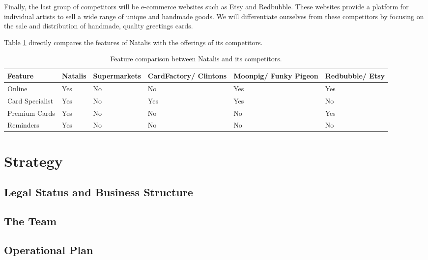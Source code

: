 \documentclass[10pt, a4paper]{article}
\begin{document}
Finally, the last group of competitors will be e-commerce websites such as Etsy and Redbubble. These websites provide a platform for individual artists to sell a wide range of unique and handmade goods. We will differentiate ourselves from these competitors by focusing on the sale and distribution of handmade, quality greetings cards.

Table \ref{table:competitor_analysis} directly compares the features of Natalis with the offerings of its competitors.

\begin{table}[h]\footnotesize\centering
 \begin{tabular}{ | p{2cm} | p{2cm} | p{2cm} | p{2cm} | p{2cm} | p{2cm} | }
    \hline
    Feature & Natalis & Supermarkets & CardFactory/ Clintons & Moonpig/ Funky Pigeon & Redbubble/ Etsy \\
    \hline
    Online & \cellcolor{tableGreen}Yes & \cellcolor{tableRed}No & \cellcolor{tableRed}No & \cellcolor{tableGreen}Yes & \cellcolor{tableGreen}Yes \\
    Card Specialist & \cellcolor{tableGreen}Yes & \cellcolor{tableRed}No & \cellcolor{tableGreen}Yes & \cellcolor{tableGreen}Yes & \cellcolor{tableRed}No \\
    Premium Cards& \cellcolor{tableGreen}Yes & \cellcolor{tableRed}No & \cellcolor{tableRed}No & \cellcolor{tableRed}No & \cellcolor{tableGreen}Yes \\
    Reminders & \cellcolor{tableGreen}Yes	& \cellcolor{tableRed}No & \cellcolor{tableRed}No & \cellcolor{tableRed}No & \cellcolor{tableRed}No \\
    \hline
  \end{tabular}
  \caption{Feature comparison between Natalis and its competitors.}
	\label{table:competitor_analysis}
\end{table}

\section*{Strategy}
\subsection*{Legal Status and Business Structure}

\subsection*{The Team}

\subsection*{Operational Plan}
\end{document}
